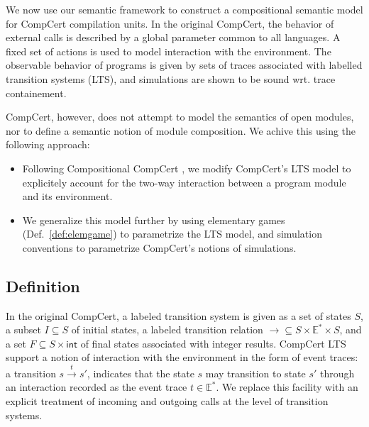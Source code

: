 \documentclass[acmsmall,timestamp,review,anonymous]{acmart}
\newcommand{\kw}[1]{\ensuremath{ \mathsf{#1} }}
\begin{document}
We now use our semantic framework
to construct a compositional semantic model
for CompCert compilation units.
In the original CompCert,
the behavior of external calls
is described by a global parameter common to all languages.
A fixed set of actions is used to model
interaction with the environment.
The observable behavior of programs
is given by sets of traces associated with
labelled transition systems (LTS),
and simulations
are shown to be sound wrt. trace containement.

CompCert, however,
does not attempt to model the semantics of open modules,
nor to define a semantic notion of module composition.
We achive this using the following approach:
\begin{itemize}
\item Following Compositional CompCert \cite{compcompcert},
  we modify CompCert's LTS model
  to explicitely account for the two-way interaction
  between a program module and its environment.
\item We generalize this model further by
  using elementary games (Def.~\ref{def:elemgame})
  to parametrize the LTS model, and
  simulation conventions to parametrize
  CompCert's notions of simulations.
\end{itemize}


\subsection{Definition} %
\label{sec:modsem:def}

In the original CompCert,
a labeled transition system is given as
a set of states $S$,
a subset $I \subseteq S$ of initial states,
a labeled transition relation
${\rightarrow} \subseteq S \times \mathbb{E}^* \times S$,
and a set
$F \subseteq S \times \kw{int}$
of final states associated with integer results.
CompCert LTS support a notion of interaction with the environment
in the form of event traces:
a transition $s \stackrel{t}{\rightarrow} s'$,
indicates that the state $s$ may transition to state $s'$
through an interaction recorded as the event trace $t \in \mathbb{E}^*$.
We replace this facility with
an explicit treatment of incoming and outgoing calls
at the level of transition systems.
\end{document}
